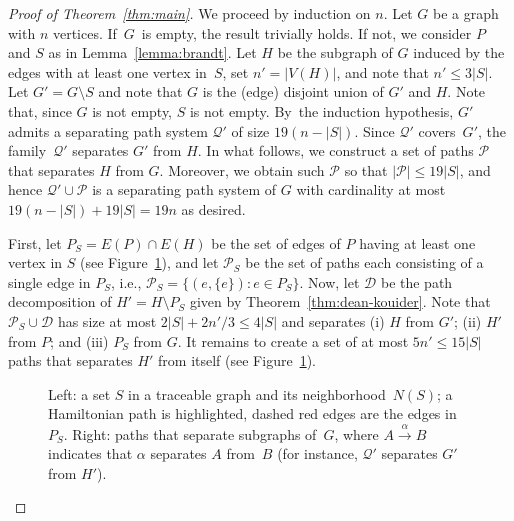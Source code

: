 \begin{proof}[Proof of Theorem~\ref{thm:main}]
We proceed by induction on $n$.
Let \(G\) be a graph with \(n\) vertices.
If~\(G\)~is empty, the result trivially holds.
If not, we consider $P$ and $S$ as in Lemma~\ref{lemma:brandt}.
Let \(H\) be the subgraph of \(G\) induced by the edges with at least one vertex in~\(S\),
set \(n' = |V(H)|\),
and note that \(n' \leq 3|S|\).
Let \(G' = G \setminus S\) and note that \(G\) is the (edge) disjoint union of \(G'\) and \(H\).
Note that, since \(G\) is not empty, \(S\) is not empty.
By~the induction hypothesis, \(G'\) admits a separating path system \(\mathcal{Q}'\)
of size \(19(n-|S|)\).
Since \(\mathcal{Q}'\) covers~\(G'\), the family~\(\mathcal{Q}'\) separates  \(G'\) from \(H\).
In what follows, we construct a set of paths \(\mathcal{P}\) that separates
\(H\) from \(G\).
Moreover, we obtain such \(\mathcal{P}\) so that \(|\mathcal{P}| \leq 19|S|\),
and hence \(\mathcal{Q}' \cup \mathcal{P}\)
is a separating path system of \(G\)
with cardinality at most \(19(n-|S|) + 19 |S| = 19n\) as desired.

First, let \(P_S = E(P) \cap E(H)\) be the set of edges of \(P\) having at least one vertex in \(S\) (see Figure~\ref{fig:NS}), and let \(\mathcal{P}_S\) be the set of paths each
consisting of a single edge in \(P_S\), i.e., \(\mathcal{P}_S = \{(e,\{e\}) : e \in P_S\}\).
Now, let \(\mathcal{D}\) be the path decomposition of \(H' = H\setminus P_S\) given by Theorem~\ref{thm:dean-kouider}.
Note that \(\mathcal{P}_S \cup \mathcal{D}\)
has size at most \(2|S| + 2n'/3 \leq 4|S|\) and separates
(i)  \(H\) from \(G'\);
(ii)  \(H'\) from \(P\);
and (iii) \(P_S\) from \(G\).
It remains to create a set of at most \(5n' \leq 15|S|\) paths that separates \(H'\) from itself  (see Figure~\ref{fig:NS}).
\begin{figure}
  \vspace*{-1.5cm}
  \begin{center}
    \hfill
    \begin{minipage}{.48\textwidth}
      
    \end{minipage}
    \hfill
    \begin{minipage}{.48\textwidth}
      \vspace*{1.5cm}
      
    \end{minipage}
    \vspace*{-1.3\baselineskip}
    \caption{Left: a set $S$ in a traceable graph and its neighborhood~$N(S)$;
              a Hamiltonian path is highlighted, dashed red edges are the edges in~$P_S$. Right: paths that separate subgraphs of~$G$, where $A\stackrel{\alpha}{\to}B$ indicates that $\alpha$ separates $A$ from~$B$ (for instance, $\mathcal{Q'}$ separates $G'$ from $H'$).}\label{fig:NS}
  \end{center}
\end{figure}


\end{proof}

